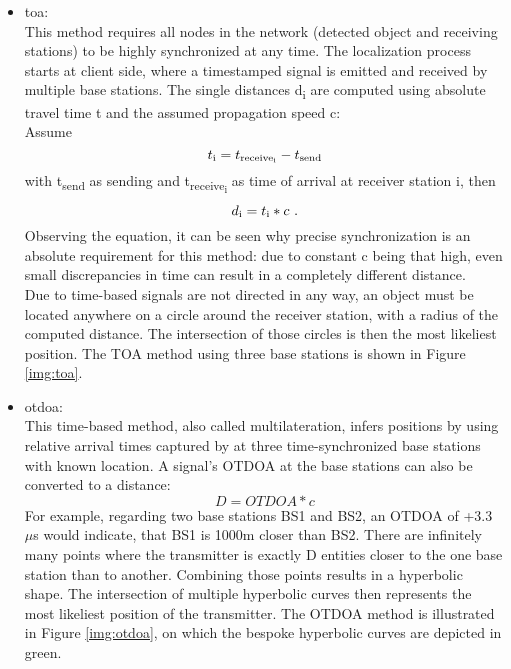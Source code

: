 \begin{itemize}
	\item \ac{toa}:\\
	This method requires all nodes in the network (detected object and receiving stations) to be highly synchronized at any time. 
	The localization process starts at client side, where a timestamped signal is emitted and received by multiple base stations. The single distances d\textsubscript{i} are computed using absolute travel time t and the assumed propagation speed c: \\		 
	Assume 
	\[ t\textsubscript{i} = t\textsubscript{receive\textsubscript{i}} - t\textsubscript{send} \]
	with t\textsubscript{send} as sending and t\textsubscript{receive\textsubscript{i}} as time of arrival at receiver station i, then
	\[ d\textsubscript{i} =  t\textsubscript{i}  *  c \text{  .}\] 
	Observing the equation, it can be seen why precise synchronization is an absolute requirement for this method: due to constant c being that high, even small discrepancies in time can result in a completely different distance.\\
	Due to time-based signals are not directed in any way, an object must be located anywhere on a circle around the receiver station, with a radius of the computed distance. The intersection of those circles is then the most likeliest position.
	The TOA method using three base stations is shown in Figure \ref{img:toa}.
	\\
	
	\item \ac{otdoa}:\\
	This time-based method, also called multilateration, infers positions by using relative arrival times captured by at three time-synchronized base stations with known location. A signal's OTDOA at the base stations can also be converted to a distance: \[ D = OTDOA * c\]
	For example, regarding two base stations BS1 and BS2, an OTDOA of +3.3 $\mu$s would indicate, that BS1 is 1000m closer than BS2. 
	There are infinitely many points where the transmitter is exactly D entities closer to the one base station than to another. Combining those points results in a hyperbolic shape. The intersection of multiple hyperbolic curves then represents the most likeliest position of the transmitter.
	The OTDOA method is illustrated in Figure \ref{img:otdoa}, on which the bespoke hyperbolic curves are depicted in green.
	

\end{itemize}
